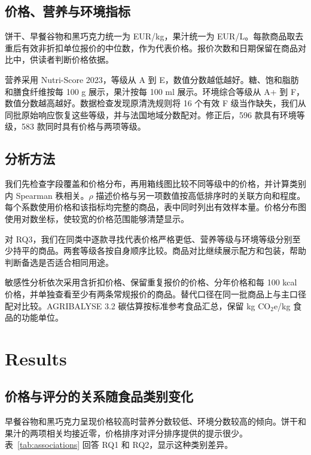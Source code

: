\documentclass[11pt,a4paper,onecolumn,oneside]{tau-class/tau}
\begin{document}
\subsection{价格、营养与环境指标}
饼干、早餐谷物和黑巧克力统一为 EUR/kg，果汁统一为 EUR/L。每款商品取去重后有效非折扣单位报价的中位数，作为代表价格。报价次数和日期保留在商品对比中，供读者判断价格依据。

营养采用 Nutri-Score 2023，等级从 A 到 E，数值分数越低越好。糖、饱和脂肪和膳食纤维按每 100 g 展示，果汁按每 100 ml 展示。环境综合等级从 A+ 到 F，数值分数越高越好。数据检查发现原清洗规则将 16 个有效 F 级当作缺失，我们从同批原始响应恢复这些等级，并与法国地域分数配对。修正后，596 款具有环境等级，583 款同时具有价格与两项等级。

\subsection{分析方法}
我们先检查字段覆盖和价格分布，再用箱线图比较不同等级中的价格，并计算类别内 Spearman 秩相关。$\rho$ 描述价格与另一项数值按高低排序时的关联方向和程度。每个系数使用价格和该指标均完整的商品，表中同时列出有效样本量。价格分布图使用对数坐标，使较宽的价格范围能够清楚显示。

对 RQ3，我们在同类中逐款寻找代表价格严格更低、营养等级与环境等级分别至少持平的商品。两套等级各按自身顺序比较。商品对比继续展示配方和包装，帮助判断备选是否适合相同用途。

敏感性分析依次采用含折扣价格、保留重复报价的价格、分年价格和每 100 kcal 价格，并单独查看至少有两条常规报价的商品。替代口径在同一批商品上与主口径配对比较。AGRIBALYSE 3.2 碳估算按标准参考食品汇总，保留 kg CO$_2$e/kg 食品的功能单位。

\section{Results}
\subsection{价格与评分的关系随食品类别变化}
早餐谷物和黑巧克力呈现价格较高时营养分数较低、环境分数较高的倾向。饼干和果汁的两项相关均接近零，价格排序对评分排序提供的提示很少。表~\ref{tab:associations} 回答 RQ1 和 RQ2，显示这种类别差异。
\begin{table}[!ht]\centering\scriptsize\caption{类别内价格与综合分数的 Spearman 相关。营养分数越低越好，环境分数越高越好。每项系数使用自己的有效样本。}\label{tab:associations}\end{table}
\end{document}
